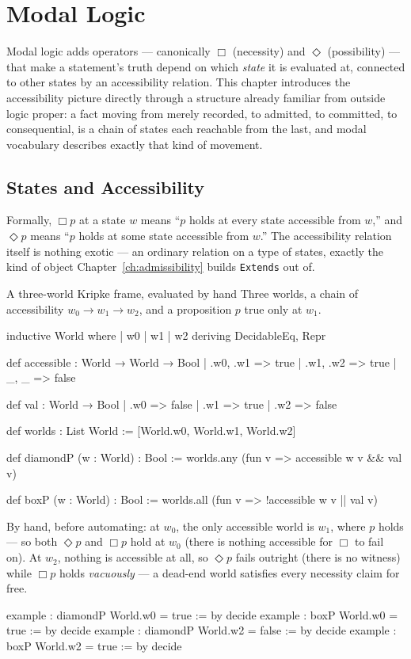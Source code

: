 \chapter{Modal Logic}
\label{ch:modal}

Modal logic adds operators — canonically $\Box$ (necessity) and
$\Diamond$ (possibility) — that make a statement's truth depend on
which \emph{state} it is evaluated at, connected to other states by
an accessibility relation. This chapter introduces the accessibility
picture directly through a structure already familiar from outside
logic proper: a fact moving from merely recorded, to admitted, to
committed, to consequential, is a chain of states each reachable
from the last, and modal vocabulary describes exactly that kind of
movement.

\section{States and Accessibility}

Formally, $\Box p$ at a state $w$ means ``$p$ holds at every state
accessible from $w$,'' and $\Diamond p$ means ``$p$ holds at some
state accessible from $w$.'' The accessibility relation itself is
nothing exotic — an ordinary relation on a type of states, exactly
the kind of object Chapter~\ref{ch:admissibility} builds
\texttt{Extends} out of.

\begin{experiment}{A three-world Kripke frame, evaluated by hand}
Three worlds, a chain of accessibility $w_0 \to w_1 \to w_2$, and a
proposition $p$ true only at $w_1$.
\begin{lean}
inductive World where
  | w0 | w1 | w2
  deriving DecidableEq, Repr

def accessible : World → World → Bool
  | .w0, .w1 => true
  | .w1, .w2 => true
  | _, _ => false

def val : World → Bool
  | .w0 => false
  | .w1 => true
  | .w2 => false

def worlds : List World := [World.w0, World.w1, World.w2]

def diamondP (w : World) : Bool :=
  worlds.any (fun v => accessible w v && val v)

def boxP (w : World) : Bool :=
  worlds.all (fun v => !accessible w v || val v)
\end{lean}
By hand, before automating: at $w_0$, the only accessible world is
$w_1$, where $p$ holds — so both $\Diamond p$ and $\Box p$ hold at
$w_0$ (there is nothing accessible for $\Box$ to fail on). At $w_2$,
nothing is accessible at all, so $\Diamond p$ fails outright (there
is no witness) while $\Box p$ holds \emph{vacuously} — a dead-end
world satisfies every necessity claim for free.
\begin{lean}
example : diamondP World.w0 = true := by decide
example : boxP World.w0 = true := by decide
example : diamondP World.w2 = false := by decide
example : boxP World.w2 = true := by decide
\end{lean}
\end{experiment}

